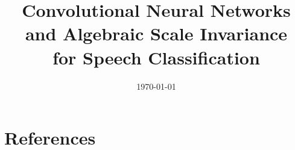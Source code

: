 \documentclass[a4paper]{article}
\begin{document}
\title{Convolutional Neural Networks and Algebraic Scale Invariance \\ for Speech Classification}
\address{Technical University Of Denmark}
\date{\today}

\maketitle








\section{References}
\printbibliography[heading=none]

\appendix

\end{document}
